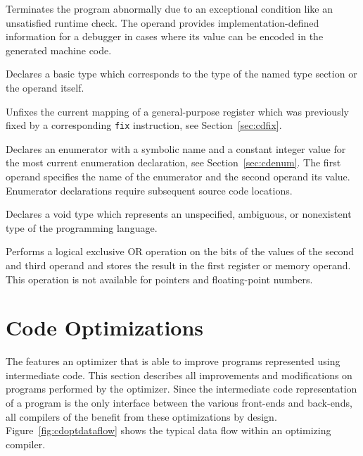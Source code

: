 
Terminates the program abnormally due to an exceptional condition like an unsatisfied runtime check.
The operand provides implementation-defined information for a debugger in cases where its value can be encoded in the generated machine code.


Declares a basic type which corresponds to the type of the named type section or the operand itself.


Unfixes the current mapping of a general-purpose register which was previously fixed by a corresponding \texttt{fix} instruction, see Section~\ref{sec:cdfix}.


Declares an enumerator with a symbolic name and a constant integer value for the most current enumeration declaration, see Section~\ref{sec:cdenum}.
The first operand specifies the name of the enumerator and the second operand its value.
Enumerator declarations require subsequent source code locations.


Declares a void type which represents an unspecified, ambiguous, or nonexistent type of the programming language.


Performs a logical exclusive OR operation on the bits of the values of the second and third operand and stores the result in the first register or memory operand.
This operation is not available for pointers and floating-point numbers.

\section{Code Optimizations}\label{sec:cdoptimizations}

The \ecs{} features an optimizer that is able to improve programs represented using intermediate code.
This section describes all improvements and modifications on programs performed by the optimizer.
Since the intermediate code representation of a program is the only interface between the various front-ends and back-ends,
all compilers of the \ecs{} benefit from these optimizations by design.
Figure~\ref{fig:cdoptdataflow} shows the typical data flow within an optimizing compiler.

